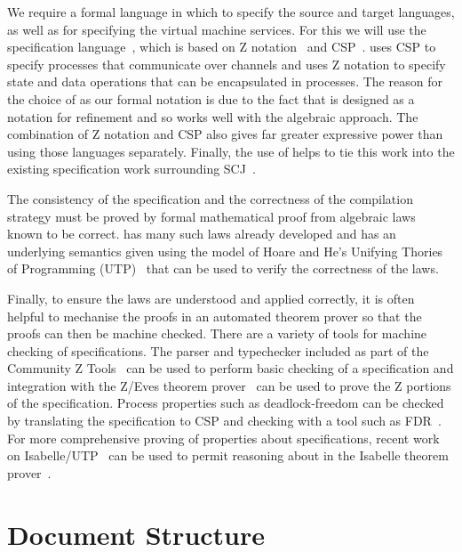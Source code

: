 \documentclass[a4paper,10pt]{report}
\begin{document}
We require a formal language in which to specify the source and target
languages, as well as for specifying the virtual machine services.
For this we will use the \Circus{} specification
language~\cite{oliveira2009}, which is based on Z
notation~\cite{woodcock1996} and CSP~\cite{roscoe2011}.
\Circus{} uses CSP to specify processes that communicate over channels
and uses Z notation to specify state and data operations that can be
encapsulated in processes.
The reason for the choice of \Circus{} as our formal notation is due
to the fact that \Circus{} is designed as a notation for refinement
and so works well with the algebraic approach.
The combination of Z notation and CSP also gives far greater
expressive power than using those languages separately.
Finally, the use of \Circus{} helps to tie this work into the existing
specification work surrounding SCJ~\cite{cavalcanti2011,
  cavalcanti2011a, cavalcanti2013, zeyda2011}.

The consistency of the specification and the correctness of the
compilation strategy must be proved by formal mathematical proof from
algebraic laws known to be correct.
\Circus{} has many such laws already developed and has an underlying
semantics given using the model of Hoare and He's Unifying Thories of
Programming (UTP)~\cite{hoare1998} that can be used to verify the
correctness of the laws.

Finally, to ensure the laws are understood and applied correctly, it
is often helpful to mechanise the proofs in an automated theorem
prover so that the proofs can then be machine checked.
There are a variety of tools for machine checking of \Circus{}
specifications.
The \Circus{} parser and typechecker included as part of the Community
Z Tools~\cite{malik2011, xavier2008, malik2005, miller2005} can be
used to perform basic checking of a \Circus{} specification and
integration with the Z/Eves theorem prover~\cite{saaltink1997} can be
used to prove the Z portions of the \Circus{} specification.
Process properties such as deadlock-freedom can be checked by
translating the \Circus{} specification to CSP and checking with a
tool such as FDR~\cite{gibson-robinson2014}.
For more comprehensive proving of properties about \Circus
specifications, recent work on Isabelle/UTP~\cite{foster2015} can be
used to permit reasoning about \Circus{} in the Isabelle theorem
prover~\cite{nipkow2002}.

\section{Document Structure}
\end{document}
